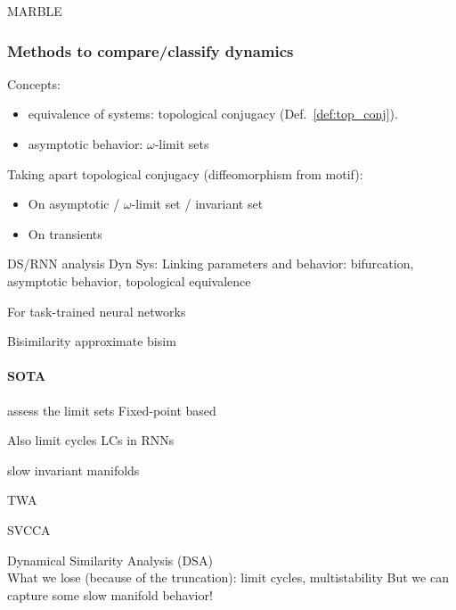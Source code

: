 \documentclass{article}
\theoremstyle{definition} \newtheorem{definition}{Definition}  \newtheorem{example}{Example}
\theoremstyle{remark} \newtheorem{remark}{Remark}
\newcounter{ct}
\begin{document}
MARBLE \citep{gosztolai2025marble}


\subsubsection{Methods to compare/classify dynamics}\label{sec:compare}
Concepts:
\begin{itemize}
\item equivalence of systems: topological conjugacy (Def.~\ref{def:top_conj}).%
\item asymptotic behavior: $\omega$-limit sets
\end{itemize}

Taking apart topological conjugacy (diffeomorphism from motif):
\begin{itemize}
\item On asymptotic / $\omega$-limit set / invariant set
\item On transients \citep{koch2024biological}
\end{itemize}


DS/RNN analysis
Dyn Sys: Linking parameters and behavior: bifurcation, asymptotic behavior, topological equivalence \citep{beer1995ctrnn, beer2006parameterspace}

For task-trained neural networks
\citep{huang2024measuring}

Bisimilarity\citep{vanderschaft2004bisimulation, vanderschaft2004equivalence, pola2004bisimulation, pola2006equivalence, tabuada2004bisimilar}
approximate bisim\citep{girard2011approximate}

\paragraph{SOTA}
\citep{mezic2004comparison}

assess the limit sets
Fixed-point based \citep{sussillo2013blackbox,katz2017fibers,golub2018fixedpointfinder}

Also limit cycles 
LCs in RNNs \citep{townley2000existence} \citep{pals2024inferring}

slow invariant manifolds\citep{Sagodi2024a}

TWA\citep{moriel2024timewarpattend}

SVCCA\citep{raghu2017svcca}

Dynamical Similarity Analysis (DSA) \citep{ostrow2024beyond} \citep{kamiya2024koopman}\\
What we lose (because of the truncation): limit cycles, multistability
But we can capture some slow manifold behavior!
\end{document}
